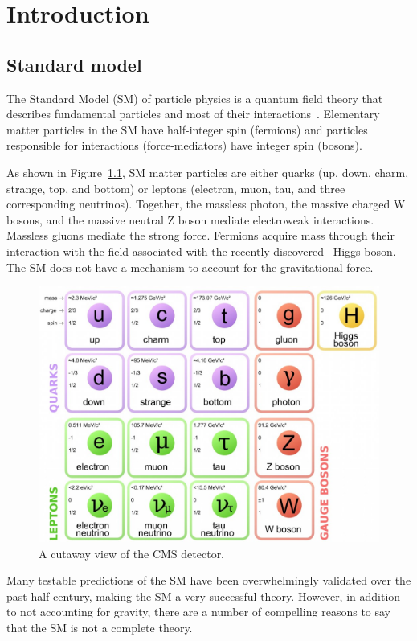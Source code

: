 \chapter{Introduction}


\section{Standard model}

The Standard Model (SM) of particle physics is a
quantum field theory that describes fundamental particles and most of their
interactions~\cite{THEORY:Glashow1961tr,THEORY:Weinberg1967tq,THEORY:Salam1968rm}.
Elementary matter particles in the SM have half-integer spin
(fermions) and particles responsible for interactions (force-mediators) have
integer spin (bosons).

As shown in Figure~\ref{fig:smtable}, SM matter particles are either quarks
(up, down, charm, strange, top, and bottom) or leptons (electron, muon, tau,
and three corresponding neutrinos). Together, the massless photon, the massive charged W bosons, and the massive neutral Z
boson mediate electroweak interactions. Massless gluons mediate the
strong force. Fermions acquire mass through their interaction with the field
associated with the
recently-discovered~\cite{CMS:HiggsObservation,ATLAS:HiggsObservation} Higgs
boson. The SM does not have a mechanism to account for the gravitational
force.


\begin{figure}[!htbp]
    \centering
    \includegraphics[width=0.75\linewidth]{figs/misc/smtable.jpg}
    \caption{
        A cutaway view of the CMS detector.
    }
    \label{fig:smtable}
\end{figure}

Many testable predictions of the SM have been overwhelmingly validated over
the past half century, making the SM a very successful theory.
However, in addition to not accounting for gravity, there are a number
of compelling reasons to say that the SM is not a complete theory.

